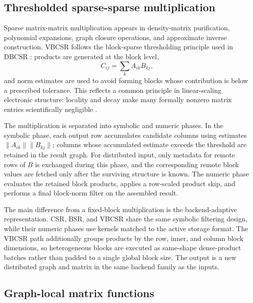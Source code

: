\documentclass[
reprint,
superscriptaddress,
frontmatterverbose,
amsmath,amssymb,
pra,
]{revtex4-2}
\begin{document}
\subsection{Thresholded sparse-sparse multiplication}

Sparse matrix-matrix multiplication appears in density-matrix purification,
polynomial expansions, graph closure operations, and approximate inverse
construction.  VBCSR follows the block-sparse thresholding principle used in
DBCSR \cite{sivkov2019dbcsr}: products are generated at the block level,
\begin{equation}
    C_{ij} = \sum_k A_{ik} B_{kj},
    \label{eq:spgemm}
\end{equation}
and norm estimates are used to avoid forming blocks whose contribution is below
a prescribed tolerance.  This reflects a common principle in linear-scaling
electronic structure: locality and decay make many formally nonzero matrix
entries scientifically negligible
\cite{prodan2005nearsightedness,benzi2013decay,benzi2007decay}.

The multiplication is separated into symbolic and numeric phases.  In the
symbolic phase, each output row accumulates candidate columns using estimates
$\|A_{ik}\|\|B_{kj}\|$; columns whose accumulated estimate exceeds the
threshold are retained in the result graph.  For distributed input, only
metadata for remote rows of $B$ is exchanged during this phase, and the
corresponding remote block values are fetched only after the surviving
structure is known.  The numeric phase evaluates the retained block products,
applies a row-scaled product skip, and performs a final block-norm filter on
the assembled result.

The main difference from a fixed-block multiplication is the backend-adaptive
representation.  CSR, BSR, and VBCSR share the same symbolic filtering design,
while their numeric phases use kernels matched to the active storage format.
The VBCSR path additionally groups products by the row, inner, and column block
dimensions, so heterogeneous blocks are executed as same-shape dense-product
batches rather than padded to a single global block size.  The output is a new
distributed graph and matrix in the same backend family as the inputs.

\subsection{Graph-local matrix functions}
\end{document}
